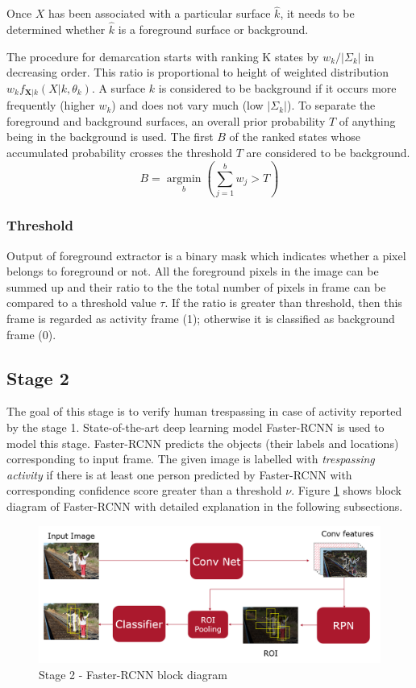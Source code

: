 Once $X$ has been associated with a particular surface $\hat{k}$, it needs to be determined whether $\hat{k}$ is a foreground surface or background. 

The procedure for demarcation starts with ranking K states by $w_k / | \Sigma_k |$ in decreasing order. This ratio is proportional to height of weighted distribution $w_k f_{\mathbf{X}|k}(X|k,\theta_k)$. A surface $k$ is considered to be 
background if it occurs more frequently (higher $w_k$) and does not vary much (low $|\Sigma_k|$).  To separate the foreground and background surfaces, an overall prior probability $T$ of anything being in the background is used. The first $B$ of the ranked  states whose accumulated probability crosses the threshold $T$ are considered to be background. 
$$ B=\operatorname*{argmin}_b (\sum_{j=1}^b w_{j} > T)$$ 



\subsubsection{Threshold}
Output of foreground extractor is a binary mask which indicates whether a pixel belongs to foreground or not. All the foreground pixels in the image can be summed up and their ratio to the the total number of pixels in frame can be compared to a threshold value $\tau$. If the ratio is greater than threshold, then this frame is regarded as activity frame (1); otherwise it is classified as background frame (0). 


\subsection{Stage 2}
The goal of this stage is to verify human trespassing in case of activity reported by the stage 1. State-of-the-art deep learning model Faster-RCNN\cite{ref_fasterrcnn} is used to model this stage. Faster-RCNN predicts the objects (their labels and locations) corresponding to input frame. The given image is labelled with \textit{trespassing activity} if there is at least one person predicted by Faster-RCNN with corresponding confidence score greater than a threshold $\nu$. Figure \ref{fig:faster-rcnn-pipeline} shows block diagram of Faster-RCNN with detailed explanation in the following subsections. 


\begin{figure}
    \centering
    \includegraphics[width=\linewidth]{images/faster-rcnn-pipeline.PNG}
    \caption{Stage 2 - Faster-RCNN block diagram}
    \label{fig:faster-rcnn-pipeline}
\end{figure}

